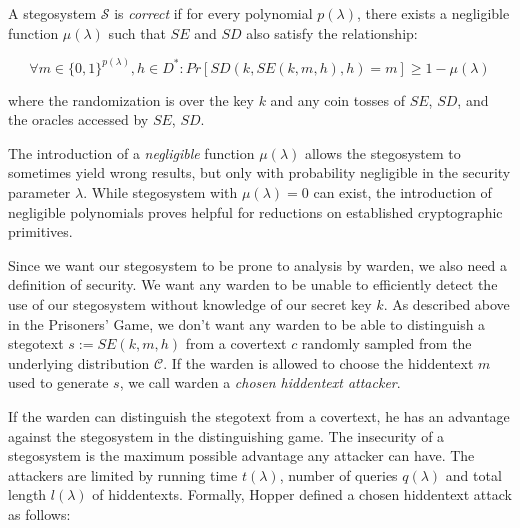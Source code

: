 \begin{definition}
\label{def:correctness-hopper}
A stegosystem $\mathcal{S}$ is \emph{correct} if for every polynomial $p(\lambda)$, there exists a negligible function $\mu(\lambda)$ such that $SE$ and $SD$ also satisfy the relationship:

$$\forall m \in \{0,1\}^{p(\lambda)}, h \in D^* \colon Pr[SD(k, SE(k, m, h), h) = m] \geq 1 - \mu(\lambda)$$

where the randomization is over the key $k$ and any coin tosses of $SE$, $SD$, and the oracles accessed by $SE$, $SD$.
\end{definition}

The introduction of a \emph{negligible} function $\mu(\lambda)$ allows the stegosystem to sometimes yield wrong results, but only with probability negligible in the security parameter $\lambda$.
While stegosystem with $\mu(\lambda) = 0$ can exist, the introduction of negligible polynomials proves helpful for reductions on established cryptographic primitives. 

Since we want our stegosystem to be prone to analysis by warden, we also need a definition of security.
We want any warden to be unable to efficiently detect the use of our stegosystem without knowledge of our secret key $k$.
As described above in the Prisoners' Game, we don't want any warden to be able to distinguish a stegotext $s := SE(k, m, h)$ from a covertext $c$ randomly sampled from the underlying distribution $\mathcal{C}$.
If the warden is allowed to choose the hiddentext $m$ used to generate $s$, we call warden a \emph{chosen hiddentext attacker}. 

If the warden can distinguish the stegotext from a covertext, he has an advantage against the stegosystem in the distinguishing game.
The insecurity of a stegosystem is the maximum possible advantage any attacker can have.
The attackers are limited by running time $t(\lambda)$, number of queries $q(\lambda)$ and total length $l(\lambda)$ of hiddentexts.
Formally, Hopper defined a chosen hiddentext attack as follows:

